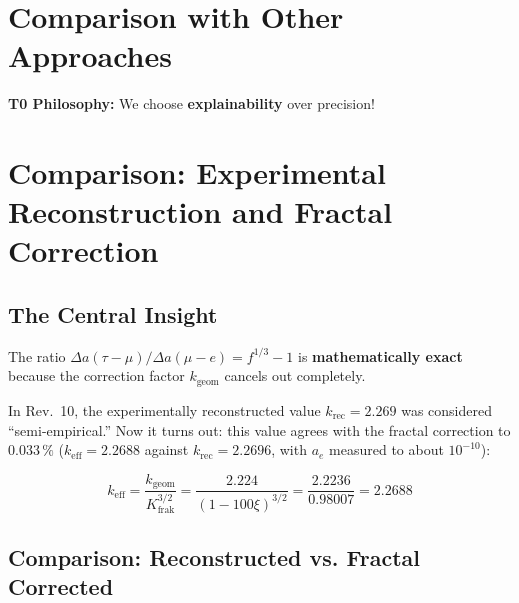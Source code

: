 	\section{Comparison with Other Approaches}
	
	\begin{table}[h]
		\centering
		\caption{Comparison of different approaches}
	\end{table}
	
	\textbf{T0 Philosophy:} We choose \textbf{explainability} over precision!
	
	\section{Comparison: Experimental Reconstruction and Fractal Correction}
	
	\subsection{The Central Insight}
	
	The ratio $\Delta a(\tau-\mu) / \Delta a(\mu-e) = f^{1/3} - 1$ is \textbf{mathematically exact} because the correction factor $k_{\text{geom}}$ cancels out completely.
	
	In Rev.~10, the experimentally reconstructed value $k_\text{rec} = 2.269$ was considered ``semi-empirical.'' Now it turns out: this value agrees with the fractal correction to $0.033\,\%$ ($k_\text{eff} = 2.2688$ against $k_\text{rec} = 2.2696$, with $a_e$ measured to about $10^{-10}$):
	
	\begin{equation}
		\boxed{k_\text{eff} = \frac{k_\text{geom}}{K_\text{frak}^{3/2}} = \frac{2.224}{(1-100\xi)^{3/2}} = \frac{2.2236}{0.98007} = 2.2688}
	\end{equation}
	
	\subsection{Comparison: Reconstructed vs. Fractal Corrected}
	
